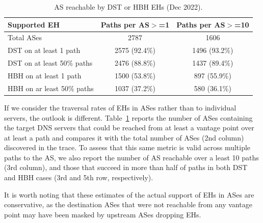 \documentclass[conference]{IEEEtran}
\begin{document}
\begin{table}
\caption{AS reachable by DST or HBH EHs (Dec 2022).}
\begin{tabular}{l|c|c}
Supported EH                & Paths per AS$>$=1 & Paths per AS$>$=10 \\
\hline \hline
Total  ASes                 & 2787              & 1606 \\
\hline
DST on at least 1 path      & 2575 (92.4\%)     & 1496 (93.2\%)      \\
DST on at least 50\% paths  & 2476 (88.8\%)     & 1437 (89.4\%)      \\ \hline
HBH on at least 1 path      & 1500 (53.8\%)      & 897 (55.9\%)      \\
HBH on ar least 50\% paths  & 1037 (37.2\%)      & 580 (36.1\%)  
\end{tabular}
\label{tbl:as_pathspider}
\end{table}

If we consider the traversal rates of EHs in ASes rather than to individual
servers, the outlook is different.  Table~\ref{tbl:as_pathspider} reports the
number of ASes containing the target DNS servers that could be reached from at
least a vantage point over at least a path and compares it with the total
number of ASes (2nd column) discovered in the trace. To assess that this same
metric is valid across multiple paths to the AS, we also report the number of
AS reachable over a least 10 paths (3rd column), and those that succeed in more
than half of paths in both DST and HBH cases (3rd and 5th row, respectively).



It is worth noting that these estimates of the actual support of EHs in ASes
are conservative, as the destination ASes that were not reachable from any
vantage point may have been masked by upstream ASes dropping EHs.

\end{document}
